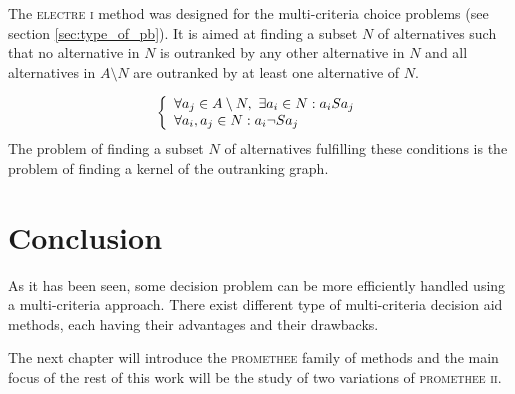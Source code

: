 The \textsc{electre i} method was designed for the multi-criteria choice problems (see section \ref{sec:type_of_pb}).
It is aimed at finding a subset $N$ of alternatives such that no alternative in $N$ is outranked by any other alternative in $N$ and all alternatives in $A\setminus N$ are outranked by at least one alternative of $N$.

\begin{equation}
    \left \{
        \begin{array}[]{l}
            \forall a_j \in A \setminus N, \ \exists a_i \in N: a_iSa_j \\
            \forall a_i, a_j \in N: a_i \neg S a_j \\
        \end{array}
        \right .
    \label{eq:electre_graph_kernel}
\end{equation}
The problem of finding a subset $N$ of alternatives fulfilling these conditions is the problem of finding a kernel of the outranking graph.


\section{Conclusion}

As it has been seen, some decision problem can be more efficiently handled using a multi-criteria approach. There exist different type of multi-criteria decision aid methods, each having their advantages and their drawbacks.

The next chapter will introduce the \textsc{promethee} family of methods and the main focus of the rest of this work will be the study of two variations of \textsc{promethee ii}.

